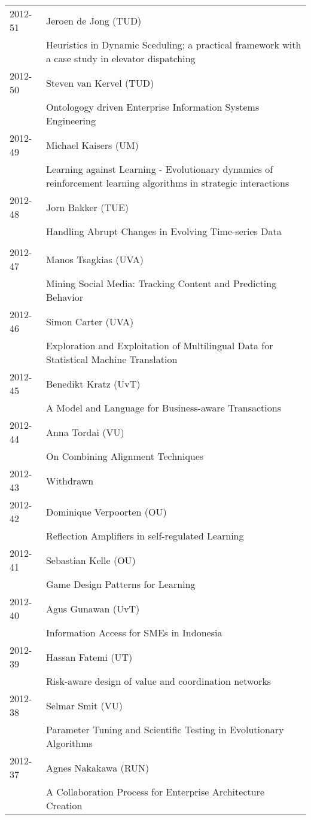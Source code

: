 \begin{longtable}{p{1.25cm}p{10.75cm}}
2012-51 & Jeroen de Jong (TUD) \\& Heuristics in Dynamic Sceduling; a practical framework with a case study in elevator dispatching \\
2012-50 & Steven van Kervel (TUD) \\& Ontologogy driven Enterprise Information Systems Engineering \\
2012-49 & Michael Kaisers (UM) \\& Learning against Learning - Evolutionary dynamics of reinforcement \newline learning algorithms in strategic interactions \\
2012-48 & Jorn Bakker (TUE) \\& Handling Abrupt Changes in Evolving Time-series Data \\
\\
2012-47 & Manos Tsagkias (UVA) \\& Mining Social Media: Tracking Content and Predicting Behavior \\
2012-46 & Simon Carter (UVA) \\& Exploration and Exploitation of Multilingual Data for Statistical Machine Translation \\
2012-45 & Benedikt Kratz (UvT) \\& A Model and Language for Business-aware Transactions \\
2012-44 & Anna Tordai (VU) \\& On Combining Alignment Techniques \\
2012-43 & Withdrawn \\
2012-42 & Dominique Verpoorten (OU) \\& Reflection Amplifiers in self-regulated Learning \\
2012-41 & Sebastian Kelle (OU) \\& Game Design Patterns for Learning \\
2012-40 & Agus Gunawan (UvT) \\& Information Access for SMEs in Indonesia \\
2012-39 & Hassan Fatemi (UT) \\& Risk-aware design of value and coordination networks \\
2012-38 & Selmar Smit (VU) \\& Parameter Tuning and Scientific Testing in Evolutionary Algorithms \\
2012-37 & Agnes Nakakawa (RUN) \\& A Collaboration Process for Enterprise Architecture Creation \\

\end{longtable}
